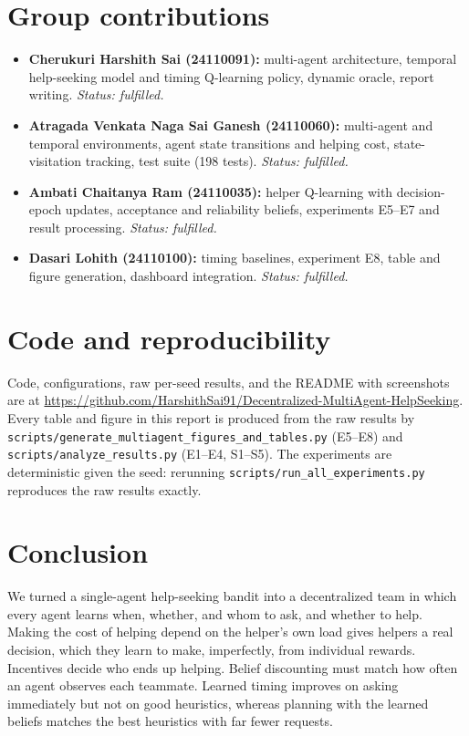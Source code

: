 \documentclass{article}
\begin{document}
\section{Group contributions}\label{sec:contributions}
\begin{itemize}[leftmargin=*]
  \item \textbf{Cherukuri Harshith Sai (24110091):} multi-agent architecture, temporal help-seeking model and timing Q-learning policy, dynamic oracle, report writing. \emph{Status: fulfilled.}
  \item \textbf{Atragada Venkata Naga Sai Ganesh (24110060):} multi-agent and temporal environments, agent state transitions and helping cost, state-visitation tracking, test suite (198 tests). \emph{Status: fulfilled.}
  \item \textbf{Ambati Chaitanya Ram (24110035):} helper Q-learning with decision-epoch updates, acceptance and reliability beliefs, experiments E5--E7 and result processing. \emph{Status: fulfilled.}
  \item \textbf{Dasari Lohith (24110100):} timing baselines, experiment E8, table and figure generation, dashboard integration. \emph{Status: fulfilled.}
\end{itemize}

\section{Code and reproducibility}\label{sec:repo}
Code, configurations, raw per-seed results, and the README with screenshots are at \url{https://github.com/HarshithSai91/Decentralized-MultiAgent-HelpSeeking}. Every table and figure in this report is produced from the raw results by \texttt{scripts/generate\_multiagent\_figures\_and\_tables.py} (E5--E8) and \texttt{scripts/analyze\_results.py} (E1--E4, S1--S5). The experiments are deterministic given the seed: rerunning \texttt{scripts/run\_all\_experiments.py} reproduces the raw results exactly.

\section{Conclusion}\label{sec:conclusion}
We turned a single-agent help-seeking bandit into a decentralized team in which every agent learns when, whether, and whom to ask, and whether to help. Making the cost of helping depend on the helper's own load gives helpers a real decision, which they learn to make, imperfectly, from individual rewards. Incentives decide who ends up helping. Belief discounting must match how often an agent observes each teammate. Learned timing improves on asking immediately but not on good heuristics, whereas planning with the learned beliefs matches the best heuristics with far fewer requests.



\end{document}
